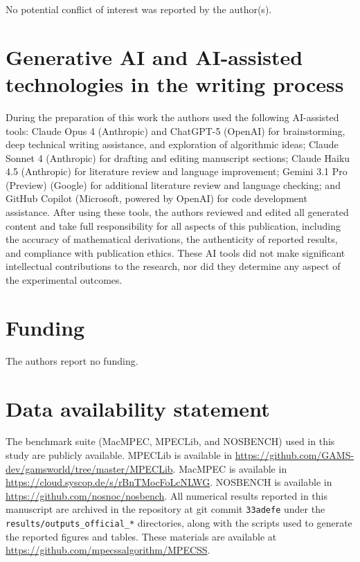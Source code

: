 \documentclass[]{interact}
\theoremstyle{plain}
\theoremstyle{definition}
\theoremstyle{remark}
\begin{document}
No potential conflict of interest was reported by the author(s).


\section*{Generative AI and AI-assisted technologies in the writing process}

During the preparation of this work the authors used the following
AI-assisted tools: Claude Opus 4 (Anthropic) and ChatGPT-5 (OpenAI) for brainstorming, deep
technical writing assistance, and exploration of algorithmic ideas;
Claude Sonnet 4 (Anthropic) for drafting and editing manuscript
sections; Claude Haiku 4.5 (Anthropic) for literature review and
language improvement; Gemini 3.1 Pro (Preview) (Google) for additional
literature review and language checking; and GitHub Copilot (Microsoft,
powered by OpenAI) for code development assistance. After using these
tools, the authors reviewed and edited all generated content and take
full responsibility for all aspects of this publication, including the
accuracy of mathematical derivations, the authenticity of reported
results, and compliance with publication ethics. These AI tools did not
make significant intellectual contributions to the research, nor did
they determine any aspect of the experimental outcomes.


\section*{Funding}

The authors report no funding.


\section*{Data availability statement}

\raggedright The benchmark suite (MacMPEC, MPECLib, and NOSBENCH) used in this study are publicly available. MPECLib is available in \url{https://github.com/GAMS-dev/gamsworld/tree/master/MPECLib}. MacMPEC is available in \url{https://cloud.syscop.de/s/rBnTMocFoLcNLWG}. NOSBENCH is available in \url{https://github.com/nosnoc/nosbench}. All numerical results reported in this manuscript are archived in the repository at git commit \texttt{33adefe} under the \texttt{results/outputs\_official\_*} directories, along with the scripts used to generate the reported figures and tables. These materials are available at \url{https://github.com/mpecssalgorithm/MPECSS}.
\end{document}
